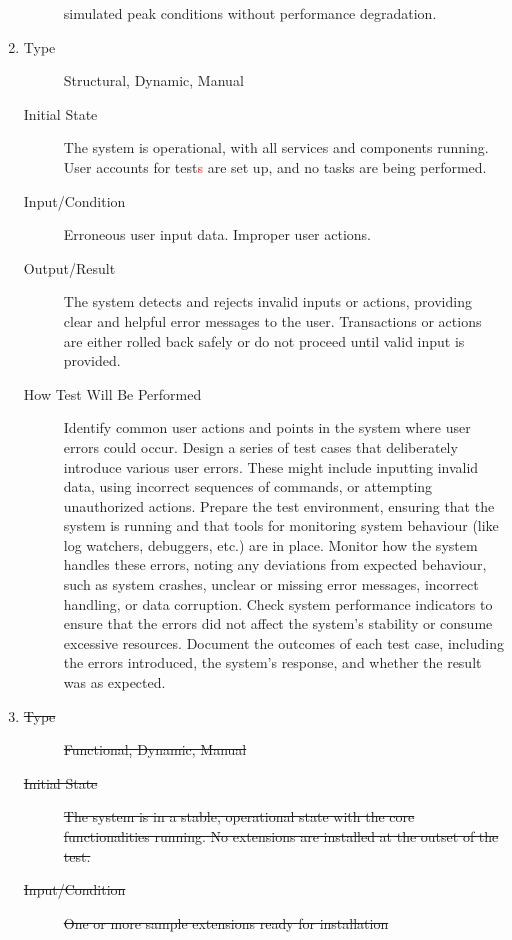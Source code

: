 \documentclass[12pt, titlepage]{article}
\newcommand{\rt}[1]{\textcolor{red}{#1}}
\begin{document}
\begin{enumerate}[NFR-T1]
\begin{description}
    simulated peak conditions without performance degradation.
  \end{description}
\item \label{NFRT4}
  \begin{description}
  \item[Type] Structural, Dynamic, Manual
  \item[Initial State] The system is operational, with all services and components
    running. User accounts for test\rt{s} are set up, and no tasks are being
    performed.
  \item[Input/Condition] Erroneous user input data. Improper user actions.
  \item[Output/Result] The system detects and rejects invalid inputs or actions,
    providing clear and helpful error messages to the user. Transactions or
    actions are either rolled back safely or do not proceed until valid input is
    provided.
  \item[How Test Will Be Performed] Identify common user actions and points in the
    system where user errors could occur. Design a series of test cases that
    deliberately introduce various user errors. These might include inputting
    invalid data, using incorrect sequences of commands, or attempting
    unauthorized actions. Prepare the test environment, ensuring that the system
    is running and that tools for monitoring system behaviour (like log
    watchers, debuggers, etc.) are in place. Monitor how the system handles
    these errors, noting any deviations from expected behaviour, such as system
    crashes, unclear or missing error messages, incorrect handling, or data
    corruption. Check system performance indicators to ensure that the errors
    did not affect the system's stability or consume excessive resources.
    Document the outcomes of each test case, including the errors introduced,
    the system's response, and whether the result was as expected.
  \end{description}
\item \label{NFRT5}
  \begin{description}
  \item[\sout{Type}] \sout{Functional, Dynamic, Manual}
  \item[\sout{Initial State}] \sout{The system is in a stable, operational state with the core
    functionalities running. No extensions are installed at the outset of the
    test.}
  \item[\sout{Input/Condition}] \sout{One or more sample extensions ready for installation}

\end{description}
\end{enumerate}
\end{document}
